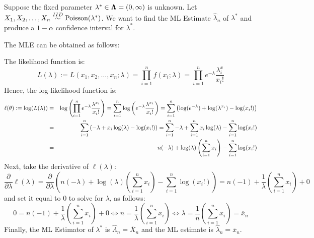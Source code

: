\begin{example}
Suppose the fixed parameter $\lambda^* \in {\Lambda}\mspace{-11 mu}{\Lambda} = (0,\infty)$ is unknown.  Let $X_1,X_2,\ldots,X_n \overset{IID}{\sim} \mbox{{\rm Poisson}}(\lambda^*)$.  We want to find the ML Estimate $\widehat{\lambda}_n$ of $\lambda^*$ and produce a $1-\alpha$ confidence interval for $\lambda^*$.

The MLE can be obtained as follows:

The likelihood function is:
\[
L(\lambda) := L(x_1,x_2,\ldots,x_n; \lambda) = \prod_{i=1}^n f(x_i;\lambda) = \prod_{i=1}^n e^{-\lambda} \frac{\lambda^x_i}{x_i!}
\]
Hence, the log-likelihood function is:
\begin{eqnarray}
\ell(\theta) := \log(L(\lambda)) 
&=&  \log \left( \prod_{i=1}^n e^{-\lambda} \frac{\lambda^{x_i}}{x_i!} \right) =  \sum_{i=1}^n \log \left(  e^{-\lambda} \frac{\lambda^{x_i}}{x_i!} \right) 
=  \sum_{i=1}^n \left( \log (e^{-\lambda}) + \log( \lambda^{x_i}) - \log({x_i!}) \right)  \notag \\
&=& \sum_{i=1}^n \left({-\lambda} + x_i \log( \lambda) - \log({x_i!}) \right) 
= \sum_{i=1}^n {-\lambda} + \sum_{i=1}^n x_i \log( \lambda) - \sum_{i=1}^n \log({x_i!})  \notag \\
&=& n ( {-\lambda}) + \log( \lambda) \left( \sum_{i=1}^n x_i \right) - \sum_{i=1}^n \log({x_i!})  \notag 
\end{eqnarray}
Next, take the derivative of $\ell(\lambda)$:
\[
\frac{\partial}{\partial \lambda} \ell (\lambda) 
= \frac{\partial}{\partial \lambda} \left(  n ( {-\lambda}) + \log( \lambda) \left( \sum_{i=1}^n x_i \right) - \sum_{i=1}^n \log({x_i!})  \right)
= n(-1) + \frac{1}{\lambda} \left( \sum_{i=1}^n x_i \right) + 0
\]
and set it equal to $0$ to solve for $\lambda$, as follows:
\[
0 = n(-1) + \frac{1}{\lambda} \left( \sum_{i=1}^n x_i \right) + 0 \iff n = \frac{1}{\lambda} \left( \sum_{i=1}^n x_i \right) \iff \lambda =  \frac{1}{n} \left( \sum_{i=1}^n x_i \right) = \overline{x}_n
\]
Finally, the ML Estimator of $\lambda^*$ is $\widehat{\Lambda}_n = \overline{X}_n$ and the ML estimate is $\widehat{\lambda}_n = \overline{x}_n$.


\end{example}
